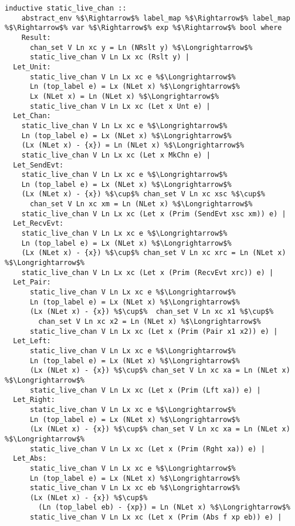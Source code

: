 \begin{lstlisting}[style=codestyle1, escapechar=\%]
  inductive static_live_chan ::
    abstract_env %$\Rightarrow$% label_map %$\Rightarrow$% label_map %$\Rightarrow$% var %$\Rightarrow$% exp %$\Rightarrow$% bool where
    Result:
      chan_set V Ln xc y = Ln (NRslt y) %$\Longrightarrow$%
      static_live_chan V Ln Lx xc (Rslt y) |
  Let_Unit:
      static_live_chan V Ln Lx xc e %$\Longrightarrow$%
      Ln (top_label e) = Lx (NLet x) %$\Longrightarrow$%
      Lx (NLet x) = Ln (NLet x) %$\Longrightarrow$%
      static_live_chan V Ln Lx xc (Let x Unt e) |
  Let_Chan:
    static_live_chan V Ln Lx xc e %$\Longrightarrow$%
    Ln (top_label e) = Lx (NLet x) %$\Longrightarrow$%
    (Lx (NLet x) - {x}) = Ln (NLet x) %$\Longrightarrow$%
    static_live_chan V Ln Lx xc (Let x MkChn e) |
  Let_SendEvt:
    static_live_chan V Ln Lx xc e %$\Longrightarrow$%
    Ln (top_label e) = Lx (NLet x) %$\Longrightarrow$%
    (Lx (NLet x) - {x}) %$\cup$% chan_set V Ln xc xsc %$\cup$%
      chan_set V Ln xc xm = Ln (NLet x) %$\Longrightarrow$%
    static_live_chan V Ln Lx xc (Let x (Prim (SendEvt xsc xm)) e) |
  Let_RecvEvt:
    static_live_chan V Ln Lx xc e %$\Longrightarrow$%
    Ln (top_label e) = Lx (NLet x) %$\Longrightarrow$%
    (Lx (NLet x) - {x}) %$\cup$% chan_set V Ln xc xrc = Ln (NLet x) %$\Longrightarrow$%
    static_live_chan V Ln Lx xc (Let x (Prim (RecvEvt xrc)) e) |
  Let_Pair:
      static_live_chan V Ln Lx xc e %$\Longrightarrow$%
      Ln (top_label e) = Lx (NLet x) %$\Longrightarrow$%
      (Lx (NLet x) - {x}) %$\cup$%  chan_set V Ln xc x1 %$\cup$%
        chan_set V Ln xc x2 = Ln (NLet x) %$\Longrightarrow$%
      static_live_chan V Ln Lx xc (Let x (Prim (Pair x1 x2)) e) |
  Let_Left:
      static_live_chan V Ln Lx xc e %$\Longrightarrow$%
      Ln (top_label e) = Lx (NLet x) %$\Longrightarrow$%
      (Lx (NLet x) - {x}) %$\cup$% chan_set V Ln xc xa = Ln (NLet x) %$\Longrightarrow$%
      static_live_chan V Ln Lx xc (Let x (Prim (Lft xa)) e) |
  Let_Right:
      static_live_chan V Ln Lx xc e %$\Longrightarrow$%
      Ln (top_label e) = Lx (NLet x) %$\Longrightarrow$%
      (Lx (NLet x) - {x}) %$\cup$% chan_set V Ln xc xa = Ln (NLet x) %$\Longrightarrow$%
      static_live_chan V Ln Lx xc (Let x (Prim (Rght xa)) e) |
  Let_Abs:
      static_live_chan V Ln Lx xc e %$\Longrightarrow$%
      Ln (top_label e) = Lx (NLet x) %$\Longrightarrow$%
      static_live_chan V Ln Lx xc eb %$\Longrightarrow$%
      (Lx (NLet x) - {x}) %$\cup$%
        (Ln (top_label eb) - {xp}) = Ln (NLet x) %$\Longrightarrow$%
      static_live_chan V Ln Lx xc (Let x (Prim (Abs f xp eb)) e) |

\end{lstlisting}
